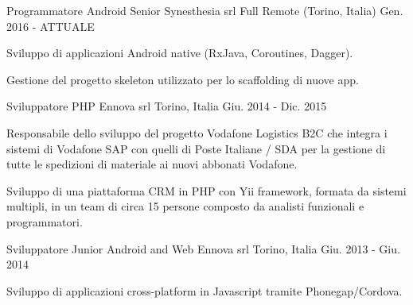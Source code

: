 


\begin{cventries}


\cventry
{Programmatore Android Senior} %
{Synesthesia srl} %
{Full Remote (Torino, Italia)} %
{Gen. 2016 - ATTUALE} %
{ %
	\begin{cvitems}
		\item {Sviluppo di applicazioni Android native (RxJava, Coroutines, Dagger).}
		\item {Gestione del progetto skeleton utilizzato per lo scaffolding di nuove app.}
	\end{cvitems}
}


\cventry
{Sviluppatore PHP} %
{Ennova srl} %
{Torino, Italia} %
{Giu. 2014 - Dic. 2015} %
{ %
	\begin{cvitems}
		\item {Responsabile dello sviluppo del progetto Vodafone Logistics B2C che integra i sistemi di Vodafone SAP con quelli di Poste Italiane / SDA per la gestione di tutte le spedizioni di materiale ai nuovi abbonati Vodafone. }
		\item {Sviluppo di una piattaforma CRM in PHP con Yii framework, formata da sistemi multipli, in un team di circa 15 persone composto da analisti funzionali e programmatori. }
	\end{cvitems}
}


\cventry
{Sviluppatore Junior Android and Web} %
{Ennova srl} %
{Torino, Italia} %
{Giu. 2013 - Giu. 2014} %
{ %
	\begin{cvitems}
		\item {Sviluppo di applicazioni cross-platform in Javascript tramite Phonegap/Cordova.}
	\end{cvitems}
}


\end{cventries}